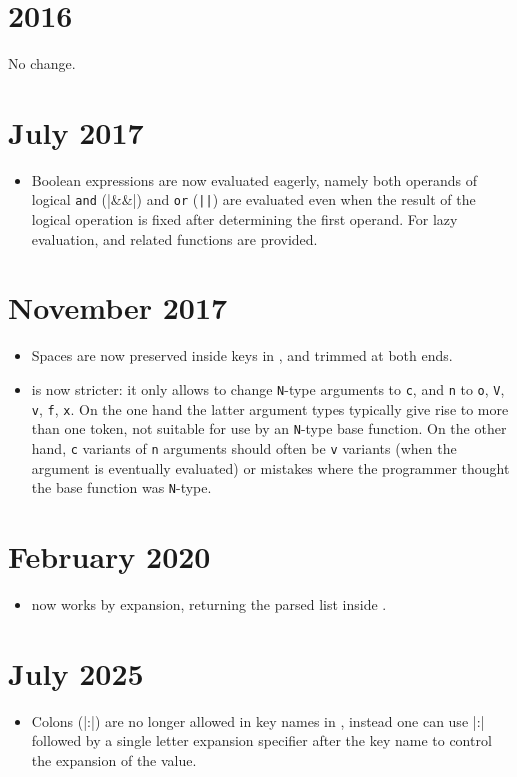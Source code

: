 \documentclass{l3doc}
\begin{document}
\section{2016}

No change.

\section{July 2017}

\begin{itemize}
  \item Boolean expressions are now evaluated eagerly, namely both
    operands of logical \texttt{and} (|&&|) and \texttt{or} (\verb"||")
    are evaluated even when the result of the logical operation is fixed
    after determining the first operand.  For lazy evaluation,
     and related functions are provided.
\end{itemize}

\section{November 2017}

\begin{itemize}
  \item Spaces are now preserved inside keys in , and
    trimmed at both ends.
  \item {} is now stricter: it only allows to
    change \texttt{N}-type arguments to \texttt{c}, and \texttt{n} to
    \texttt{o}, \texttt{V}, \texttt{v}, \texttt{f}, \texttt{x}.  On the
    one hand the latter argument types typically give rise to more than
    one token, not suitable for use by an \texttt{N}-type base function.
    On the other hand, \texttt{c} variants of \texttt{n} arguments
    should often be \texttt{v} variants (when the argument is eventually
    evaluated) or mistakes where the programmer thought the base
    function was \texttt{N}-type.
\end{itemize}

\section{February 2020}

\begin{itemize}
  \item {} now works by expansion, returning
    the parsed list inside .
\end{itemize}

\section{July 2025}

\begin{itemize}
  \item Colons (|:|) are no longer allowed in key names in ,
    instead one can use |:| followed by a single letter expansion specifier
    after the key name to control the expansion of the value.
\end{itemize}
\end{document}
